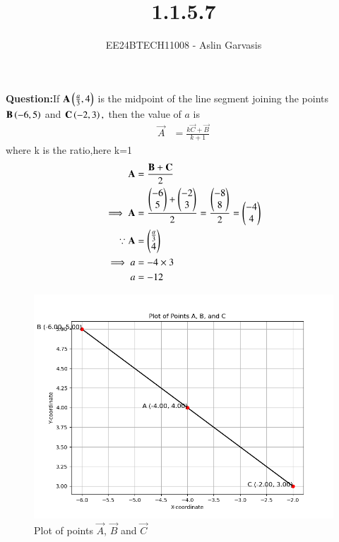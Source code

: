 \documentclass[journal]{IEEEtran}
\begin{document}

\vspace{3cm}
\title{1.1.5.7}
\author{EE24BTECH11008 - Aslin Garvasis
}
{\let\newpage\relax\maketitle}

\renewcommand{\thefigure}{\theenumi}
\renewcommand{\thetable}{\theenumi}
\setlength{\intextsep}{10pt} %


\renewcommand{\thetable}{\theenumi}
 \textbf{Question:}If $\mathbf{A}\left(\frac{a}{3},4\right)$ is the midpoint of the line segment joining the points $\mathbf{B}\left(-6,5\right)$ and $\mathbf{C}\left(-2,3\right),$  
		then the value of $a$ is\\
 
 \solution 
\begin{align}
\vec{A} &=\frac{k\vec{C}+\vec{B}}{k+1}
\end{align}	
			where k is the ratio,here k=1\\
\begin{align}
 \mathbf{A}&=\frac{\mathbf{B}+\mathbf{C}}{2}\\ 
\implies \mathbf{A}&=\frac{\begin{pmatrix}-6\\5\end{pmatrix}+\begin{pmatrix}-2\\3\end{pmatrix}}{2}=\frac{\begin{pmatrix}-8\\8\end{pmatrix}}{2}=\begin{pmatrix}-4\\4\end{pmatrix}\\
\because \mathbf{A}&=\begin{pmatrix}\frac{a}{3}\\4\end{pmatrix}\\
\implies a&=-4\times3\\ 
 a&=-12\\
\end{align}
		\newpage


		\begin{figure}[h!]
                \centering
               \includegraphics[width=0.7\linewidth]{figs/Fig1.png}
			\caption{Plot of points $\vec{A}$, $\vec{B}$ and $\vec{C}$}
               
               \end{figure}
\end{document}
